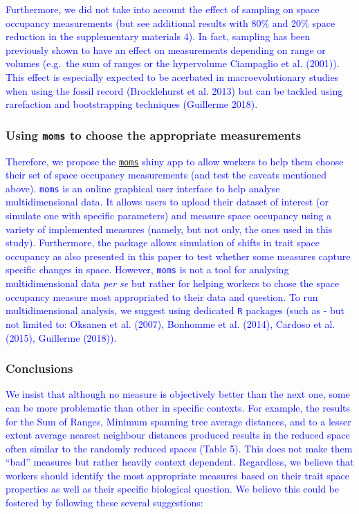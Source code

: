 \documentclass[]{article}
\begin{document}
\textcolor{blue}{ Furthermore, we did not take into
account the effect of sampling on space occupancy measurements (but see
additional results with 80\% and 20\% space reduction in the
supplementary materials 4). In fact, sampling has been previously shown
to have an effect on measurements depending on range or volumes
(e.g.~the sum of ranges or the hypervolume Ciampaglio et al. (2001)).
This effect is especially expected to be acerbated in macroevolutionary
studies when using the fossil record (Brocklehurst et al. 2013) but can
be tackled using rarefaction and bootstrapping techniques (Guillerme
2018). }

\subsubsection{\texorpdfstring{Using \texttt{moms} to choose the
appropriate
measurements}{Using moms to choose the appropriate measurements}}\label{using-moms-to-choose-the-appropriate-measurements}

\textcolor{blue}{Therefore, we propose the
\href{https://tguillerme.shinyapps.io/moms/}{\texttt{moms}} shiny app to
allow workers to help them choose their set of space occupancy
measurements (and test the caveats mentioned above). \texttt{moms} is an
online graphical user interface to help analyse multidimensional data.
It allows users to upload their dataset of interest (or simulate one
with specific parameters) and measure space occupancy using a variety of
implemented measures (namely, but not only, the ones used in this
study). Furthermore, the package allows simulation of shifts in trait
space occupancy as also presented in this paper to test whether some
measures capture specific changes in space. However, \texttt{moms} is
not a tool for analysing multidimensional data \emph{per se} but rather
for helping workers to chose the space occupancy measure most
appropriated to their data and question. To run multidimensional
analysis, we suggest using dedicated \texttt{R} packages (such as - but
not limited to: Oksanen et al. (2007), Bonhomme et al. (2014), Cardoso
et al. (2015), Guillerme (2018)). }

\subsubsection{Conclusions}\label{conclusions}

\textcolor{blue}{We insist that although no measure is
objectively better than the next one, some can be more problematic than
other in specific contexts. For example, the results for the Sum of
Ranges, Minimum spanning tree average distances, and to a lesser extent
average nearest neighbour distances produced results in the reduced
space often similar to the randomly reduced spaces (Table 5). This does
not make them ``bad'' measures but rather heavily context dependent.
Regardless, we believe that workers should identify the most appropriate
measures based on their trait space properties as well as their specific
biological question. We believe this could be fostered by following
these several suggestions: }
\end{document}
